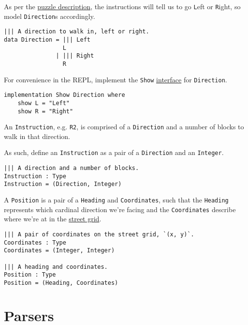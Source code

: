 \documentclass[b5paper,twoside]{amsbook}
\begin{document}
As per the \href{no-time-for-a-taxicab}{puzzle description}, the
instructions will tell us to go \texttt{L}eft or
\texttt{R}ight, so model \texttt{Direction}s
accordingly.

\begin{verbatim}
||| A direction to walk in, left or right.
data Direction = ||| Left
                 L
               | ||| Right
                 R
\end{verbatim}

For convenience in the REPL, implement the \texttt{Show}
\href{http://docs.idris-lang.org/en/latest/tutorial/interfaces.html}{interface}
for \texttt{Direction}.

\begin{verbatim}
implementation Show Direction where
    show L = "Left"
    show R = "Right"
\end{verbatim}

\newpage

An \texttt{Instruction}, e.g. \texttt{R2}, is
comprised of a \texttt{Direction} and a number of blocks to
walk in that direction.

As such, define an \texttt{Instruction} as a pair of a
\texttt{Direction} and an \texttt{Integer}.

\begin{verbatim}
||| A direction and a number of blocks.
Instruction : Type
Instruction = (Direction, Integer)
\end{verbatim}

A \texttt{Position} is a pair of a
\texttt{Heading} and \texttt{Coordinates},
such that the \texttt{Heading} represents which cardinal
direction we're facing and the \texttt{Coordinates}
describe where we're at in the
\href{https://en.wikipedia.org/wiki/Taxicab_geometry}{street grid}.

\begin{verbatim}
||| A pair of coordinates on the street grid, `(x, y)`.
Coordinates : Type
Coordinates = (Integer, Integer)

||| A heading and coordinates.
Position : Type
Position = (Heading, Coordinates)
\end{verbatim}

\section{Parsers}\label{parsers}
\end{document}

